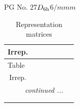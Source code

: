 \documentclass[fleqn,8pt,landscape]{jsarticle}
\begin{document}
\setcounter{MaxMatrixCols}{32}

\renewcommand{\tablename}{Table~}
\renewcommand{\figurename}{Figure~}
\begin{center}
\LARGE
PG No. 27\quad$D_{\rm 6h}$\quad$6/mmm$\quad[ hexagonal ]
\end{center}
\renewcommand{\arraystretch}{1.2}
\begin{longtable}{ccccccc}
\caption{Representation matrices}
 \\
 \hline \hline
Irrep. &  &  &  &  &  &  \\ \hline \endfirsthead

\multicolumn{6}{l}{\tablename\ \thetable{}} \\
 \hline \hline
Irrep. &  &  &  &  &  &  \\ \hline \endhead

 \hline \hline
\multicolumn{6}{r}{\footnotesize\it continued ...} \\ \endfoot

 \hline \hline
\multicolumn{6}{r}{} \\ \endlastfoot


\end{longtable}
\end{document}
